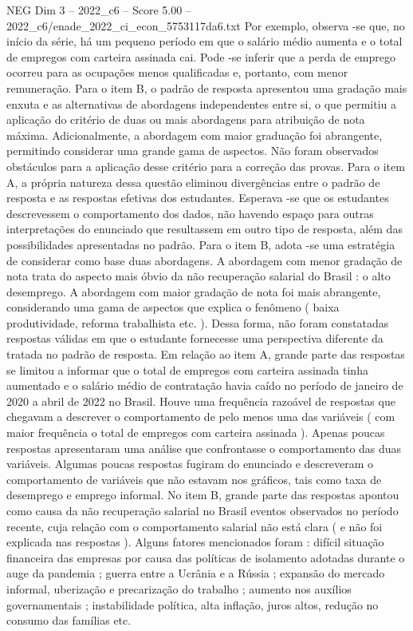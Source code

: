 \begin{textsample}{NEG Dim 3 – 2022\_c6 – Score 5.00 – 2022\_c6/enade\_2022\_ci\_econ\_5753117da6.txt}
Por exemplo, observa -se que, no início da série, há um pequeno período em que o salário médio aumenta e o total de empregos com carteira assinada cai.
Pode -se inferir que a perda de emprego ocorreu para as ocupações menos qualificadas e, portanto, com menor remuneração.
Para o item B, o padrão de resposta apresentou uma gradação mais enxuta e as alternativas de abordagens independentes entre si, o que permitiu a aplicação do critério de duas ou mais abordagens para atribuição de nota máxima.
Adicionalmente, a abordagem com maior graduação foi abrangente, permitindo considerar uma grande gama de aspectos.
Não foram observados obstáculos para a aplicação desse critério para a correção das provas.
Para o item A, a própria natureza dessa questão eliminou divergências entre o padrão de resposta e as respostas efetivas dos estudantes.
Esperava -se que os estudantes descrevessem o comportamento dos dados, não havendo espaço para outras interpretações do enunciado que resultassem em outro tipo de resposta, além das possibilidades apresentadas no padrão.
Para o item B, adota -se uma estratégia de considerar como base duas abordagens.
A abordagem com menor gradação de nota trata do aspecto mais óbvio da não recuperação salarial do Brasil : o alto desemprego.
A abordagem com maior gradação de nota foi mais abrangente, considerando uma gama de aspectos que explica o fenômeno ( baixa produtividade, reforma trabalhista etc. ).
Dessa forma, não foram constatadas respostas válidas em que o estudante fornecesse uma perspectiva diferente da tratada no padrão de resposta.
Em relação ao item A, grande parte das respostas se limitou a informar que o total de empregos com carteira assinada tinha aumentado e o salário médio de contratação havia caído no período de janeiro de 2020 a abril de 2022 no Brasil.
Houve uma frequência razoável de respostas que chegavam a descrever o comportamento de pelo menos uma das variáveis ( com maior frequência o total de empregos com carteira assinada ).
Apenas poucas respostas apresentaram uma análise que confrontasse o comportamento das duas variáveis.
Algumas poucas respostas fugiram do enunciado e descreveram o comportamento de variáveis que não estavam nos gráficos, tais como taxa de desemprego e emprego informal.
No item B, grande parte das respostas apontou como causa da não recuperação salarial no Brasil eventos observados no período recente, cuja relação com o comportamento salarial não está clara ( e não foi explicada nas respostas ).
Alguns fatores mencionados foram : difícil situação financeira das empresas por causa das políticas de isolamento adotadas durante o auge da pandemia ; guerra entre a Ucrânia e a Rússia ; expansão do mercado informal, uberização e precarização do trabalho ; aumento nos auxílios governamentais ; instabilidade política, alta inflação, juros altos, redução no consumo das famílias etc.

\end{textsample}
